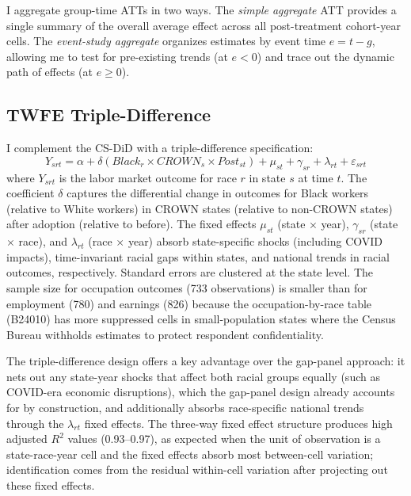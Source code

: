 \documentclass[12pt]{article}
\begin{document}
I aggregate group-time ATTs in two ways. The \textit{simple aggregate} ATT provides a single summary of the overall average effect across all post-treatment cohort-year cells. The \textit{event-study aggregate} organizes estimates by event time $e = t - g$, allowing me to test for pre-existing trends (at $e < 0$) and trace out the dynamic path of effects (at $e \geq 0$).

\subsection{TWFE Triple-Difference}

I complement the CS-DiD with a triple-difference specification:
\begin{equation}
Y_{srt} = \alpha + \delta (Black_{r} \times CROWN_{s} \times Post_{st}) + \mu_{st} + \gamma_{sr} + \lambda_{rt} + \varepsilon_{srt}
\end{equation}
where $Y_{srt}$ is the labor market outcome for race $r$ in state $s$ at time $t$. The coefficient $\delta$ captures the differential change in outcomes for Black workers (relative to White workers) in CROWN states (relative to non-CROWN states) after adoption (relative to before). The fixed effects $\mu_{st}$ (state $\times$ year), $\gamma_{sr}$ (state $\times$ race), and $\lambda_{rt}$ (race $\times$ year) absorb state-specific shocks (including COVID impacts), time-invariant racial gaps within states, and national trends in racial outcomes, respectively. Standard errors are clustered at the state level. The sample size for occupation outcomes (733 observations) is smaller than for employment (780) and earnings (826) because the occupation-by-race table (B24010) has more suppressed cells in small-population states where the Census Bureau withholds estimates to protect respondent confidentiality.

The triple-difference design offers a key advantage over the gap-panel approach: it nets out any state-year shocks that affect both racial groups equally (such as COVID-era economic disruptions), which the gap-panel design already accounts for by construction, and additionally absorbs race-specific national trends through the $\lambda_{rt}$ fixed effects. The three-way fixed effect structure produces high adjusted $R^2$ values (0.93--0.97), as expected when the unit of observation is a state-race-year cell and the fixed effects absorb most between-cell variation; identification comes from the residual within-cell variation after projecting out these fixed effects.
\end{document}
